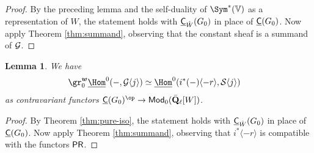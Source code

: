 \documentclass[a4paper,10pt,leqno]{amsart}
\theoremstyle{plain}
\theoremstyle{plain}
\theoremstyle{plain}
\newtheorem{lem}[thm]{Lemma}
\theoremstyle{definition}
\theoremstyle{remark}
\newcommand{\QL}{\bar{\mathbf{Q}}_\ell}
\begin{document}
\begin{proof}
By the preceding lemma and the self-duality of $\Sym^\ast(\bb{V})$ as a representation of $W$, the statement holds with $\underline{\sf{C}}_{\hat{W}}(G_0)$ in place of $\underline{\sf{C}}(G_0)$.
Now apply Theorem \ref{thm:summand}, observing that the constant sheaf is a summand of $\cal{G}$.
\end{proof}

\begin{lem}\label{lem:g-to-s}
We have
\begin{align}
\gr_0^{\bm{w}} {\SHom^0(-, \cal{G}\langle j\rangle)}
&\simeq \SHom^0(i^\ast(-)\langle-r\rangle, \cal{S}\langle j\rangle)
\end{align}
as contravariant functors $\underline{\sf{C}}(G_0)^\op \to \sf{Mod}_0(\QL[W])$.
\end{lem}

\begin{proof}
By Theorem \ref{thm:pure-iso}, the statement holds with $\underline{\sf{C}}_{\hat{W}}(G_0)$ in place of $\underline{\sf{C}}(G_0)$.
Now apply Theorem \ref{thm:summand}, observing that $i^\ast\langle -r\rangle$ is compatible with the functors $\sf{PR}$.
\end{proof}
\end{document}
